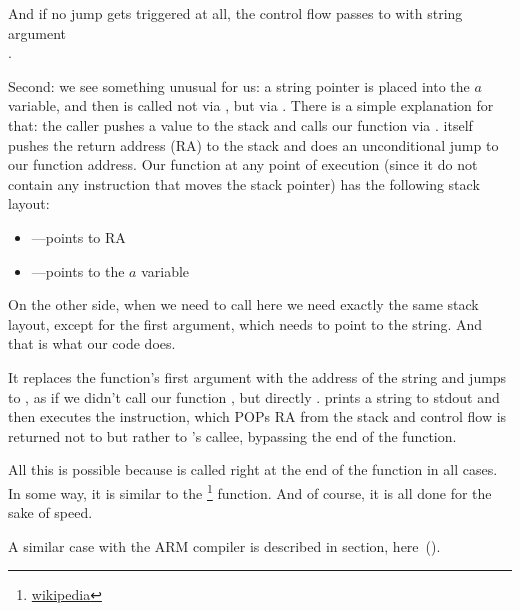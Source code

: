 And if no jump gets triggered at all, the control flow passes to \printf with string argument \\
.

\label{jump_to_last_printf}
\myindex{\Stack}

Second: we see something unusual for us: a string pointer is placed into the $a$ variable, and 
then \printf is called not via \CALL, but via \JMP. There is a simple explanation for that: 
the \gls{caller} pushes a value to the stack and calls our function via \CALL. 
\CALL itself pushes the return address (\ac{RA}) to the stack and does an unconditional jump to our function address. 
Our function at any point of execution (since it do not contain any instruction that moves the stack 
pointer) has the following stack layout:

\begin{itemize}
\item\ESP---points to \ac{RA}
\item{}---points to the $a$ variable 
\end{itemize}

On the other side, when we need to call \printf here we need exactly the same stack 
layout, except for the first \printf argument, which needs to point to the string. 
And that is what our code does.

It replaces the function's first argument with the address of the string and 
jumps to \printf, as if we didn't call our function \ttf, but directly \printf.
\printf prints a string to \gls{stdout} and then executes the \RET instruction, which POPs 
\ac{RA} from the stack and control flow is returned not to \ttf but rather to \ttf's \gls{callee}, 
bypassing the end of the \ttf function.

\newcommand{\URLSJ}{\href{http://go.yurichev.com/17121}{wikipedia}}

All this is possible because \printf is called right at the end of the \ttf function in all cases. 
In some way, it is similar to the \footnote{\URLSJ} function.
And of course, it is all done for the sake of speed.

A similar case with the ARM compiler is described in \q{\PrintfSeveralArgumentsSectionName}
section, here~().



